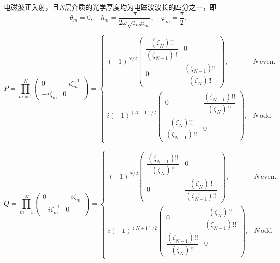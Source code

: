 \begin{example}
	电磁波正入射，且\(N\)层介质的光学厚度均为电磁波波长的四分之一，即
	\begin{equation*}
		\theta_m = 0,\quad h_m = \dfrac{\pi}{2\omega\sqrt{\varepsilon_m\mu_m}}, \quad \varphi_m = \dfrac{\pi}{2}.
	\end{equation*}

	\begin{equation*}
		P = \prod_{m=1}^{N}
		\begin{pmatrix}
			0         & -i\zeta_m^{-1} \\
			-i\zeta_m & 0
		\end{pmatrix}
		=
		\begin{cases}
			(-1)^{N/2}
			\begin{pmatrix}
				\dfrac{(\zeta_{N})!!}{(\zeta_{N-1})!!} & 0                                      \\[8pt]
				0                                      & \dfrac{(\zeta_{N-1})!!}{(\zeta_{N})!!}
			\end{pmatrix}, & N\,\text{even}. \\[20pt]
			i(-1)^{(N+1)/2}
			\begin{pmatrix}
				0                                      & \dfrac{(\zeta_{N-1})!!}{(\zeta_{N})!!} \\[8pt]
				\dfrac{(\zeta_{N})!!}{(\zeta_{N-1})!!} & 0
			\end{pmatrix}, & N\,\text{odd}
		\end{cases}
	\end{equation*}

	\begin{equation*}
		Q = \prod_{m=1}^{N}
		\begin{pmatrix}
			0              & -i\zeta_m \\
			-i\zeta_m^{-1} & 0
		\end{pmatrix}
		=
		\begin{cases}
			(-1)^{N/2}
			\begin{pmatrix}
				\dfrac{(\zeta_{N-1})!!}{(\zeta_{N})!!} & 0                                      \\[8pt]
				0                                      & \dfrac{(\zeta_{N})!!}{(\zeta_{N-1})!!}
			\end{pmatrix}, & N\,\text{even}. \\[20pt]
			i(-1)^{(N+1)/2}
			\begin{pmatrix}
				0                                      & \dfrac{(\zeta_{N})!!}{(\zeta_{N-1})!!} \\[8pt]
				\dfrac{(\zeta_{N-1})!!}{(\zeta_{N})!!} & 0
			\end{pmatrix}, & N\,\text{odd}
		\end{cases}
	\end{equation*}


\end{example}
